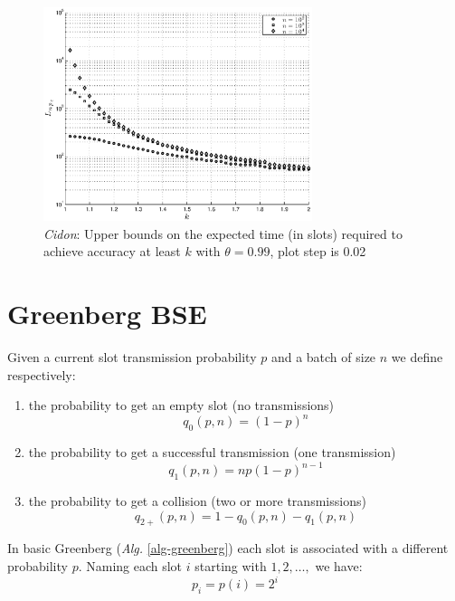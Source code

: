 \documentclass[11pt,a4paper,twoside,openright]{book}
\begin{document}
\begin{figure}[htb!]
\begin{center}
\includegraphics[width=0.7\textwidth]{matlab/Cidon/cidon-k-L-minimum}
\caption[\emph{Cidon}: Upper bounds on the expected time required for accuracy $k$]{\emph{Cidon}: Upper bounds on the expected time (in slots) required to achieve accuracy at least $k$ with $\theta=0.99$,  plot step is 0.02}
\label{cidon-k-L-minimum}
\end{center}
\end{figure}

\section{Greenberg BSE}
Given a current slot transmission probability $p$ and a batch of size $n$ we define respectively:
\begin{enumerate}
\item the probability to get an empty slot (no transmissions)
\begin{equation}q_{0}(p,n)=(1-p)^{n} \label{eq:greenberg-prob-empty}\end{equation}
\item the probability to get a successful transmission (one transmission)
\begin{equation}q_{1}(p,n)=n p (1-p)^{n-1} \label{eq:greenberg-prob-succ}\end{equation} 
\item the probability to get a collision (two or more transmissions)
\begin{equation}q_{2+}(p,n)=1-q_{0}(p,n)-q_{1}(p,n)\label{eq:greenberg-prob-coll}\end{equation}
\end{enumerate}

In basic Greenberg (\emph{Alg.} \ref{alg-greenberg}) each slot is associated with a different probability $p$. Naming each slot $i$ starting with $1, 2, \dots,$ we have:
\begin{equation}
	p_{i}=p(i)=2^{i}
\end{equation}
\end{document}

